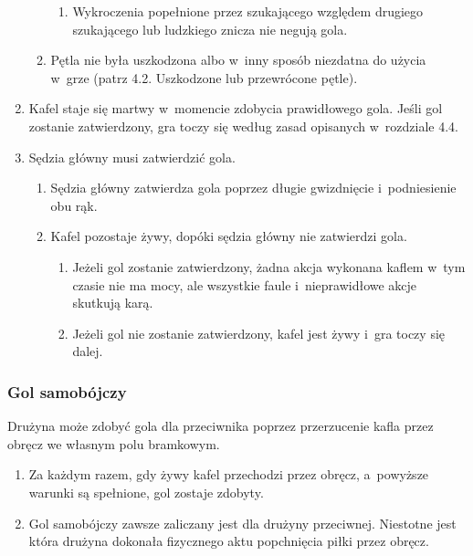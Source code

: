 \documentclass[12pt,a4paper]{article}
\begin{document}
\begin{enumerate}
\begin{enumerate}
		            \begin{enumerate}
			            \item
			                  Wykroczenia popełnione przez szukającego względem drugiego
			                  szukającego lub ludzkiego znicza nie negują gola.
		            \end{enumerate}
		      \item
		            Pętla nie była uszkodzona albo w~inny sposób niezdatna do użycia w~grze (patrz 4.2. Uszkodzone lub przewrócone pętle).
	      \end{enumerate}
	\item
	      Kafel staje się martwy w~momencie zdobycia prawidłowego gola. Jeśli
	      gol zostanie zatwierdzony, gra toczy się według zasad opisanych w~rozdziale 4.4.
	\item
	      Sędzia główny musi zatwierdzić gola.

	      \begin{enumerate}
		      \item
		            Sędzia główny zatwierdza gola poprzez długie gwizdnięcie i~podniesienie obu rąk.
		      \item
		            Kafel pozostaje żywy, dopóki sędzia główny nie zatwierdzi gola.

		            \begin{enumerate}
			            \item
			                  Jeżeli gol zostanie zatwierdzony, żadna akcja wykonana kaflem w~tym czasie nie ma mocy, ale wszystkie faule i~nieprawidłowe akcje
			                  skutkują karą.
			            \item
			                  Jeżeli gol nie zostanie zatwierdzony, kafel jest żywy i~gra toczy
			                  się dalej.
		            \end{enumerate}
	      \end{enumerate}
\end{enumerate}

\subsubsection{Gol samobójczy}
Drużyna może zdobyć gola dla
przeciwnika poprzez przerzucenie kafla przez obręcz we własnym polu
bramkowym.

\begin{enumerate}
	\item
	      Za każdym razem, gdy żywy kafel przechodzi przez obręcz, a~powyższe
	      warunki są spełnione, gol zostaje zdobyty.
	\item
	      Gol samobójczy zawsze zaliczany jest dla drużyny przeciwnej. Niestotne
	      jest która drużyna dokonała fizycznego aktu popchnięcia piłki przez
	      obręcz.
\end{enumerate}
\end{document}
